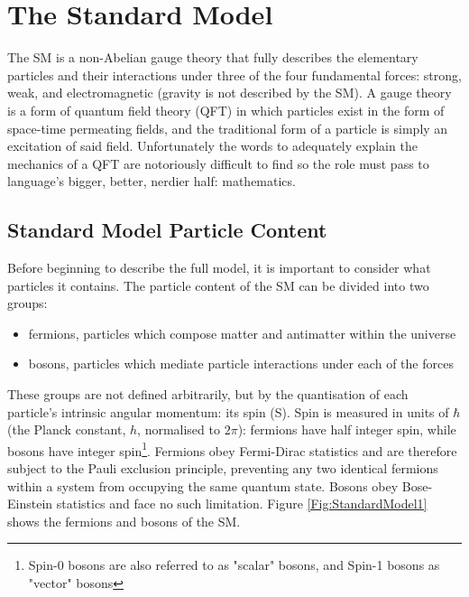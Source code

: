 \documentclass[12pt,a4paper,epsf,portrait,times,epsfig]{report}
\begin{document}

	\section{The Standard Model}

	The SM is a non-Abelian gauge theory that fully describes the elementary particles and their interactions under three of the four fundamental forces: strong, weak, and electromagnetic (gravity is not described by the SM). A gauge theory is a form of quantum field theory (QFT) in which particles exist in the form of space-time permeating fields, and the traditional form of a particle is simply an excitation of said field. Unfortunately the words to adequately explain the mechanics of a QFT are notoriously difficult to find so the role must pass to language's bigger, better, nerdier half: mathematics. \par

	\subsection{Standard Model Particle Content}

	Before beginning to describe the full model, it is important to consider what particles it contains. The particle content of the SM can be divided into two groups: 
	
	\begin{itemize}
		\item fermions, particles which compose matter and antimatter within the universe
		\item bosons, particles which mediate particle interactions under each of the forces
	\end{itemize}
	
	These groups are not defined arbitrarily, but by the quantisation of each particle's intrinsic angular momentum: its spin (S). Spin is measured in units of $\hbar$ (the Planck constant, $h$, normalised to $2\pi$): fermions have half integer spin, while bosons have integer spin\footnote{Spin-0 bosons are also referred to as "scalar" bosons, and Spin-1 bosons as "vector" bosons}. Fermions obey Fermi-Dirac statistics and are therefore subject to the Pauli exclusion principle, preventing any two identical fermions within a system from occupying the same quantum state. Bosons obey Bose-Einstein statistics and face no such limitation. Figure \ref{Fig:StandardModel1} shows the fermions and bosons of the SM. \par
\end{document}
